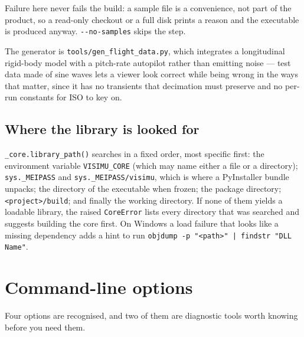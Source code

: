 \documentclass[11pt,a4paper,oneside]{report}
\newcommand{\code}[1]{\texttt{#1}}
\begin{document}
Failure here never fails the build: a sample file is a convenience, not part of
the product, so a read-only checkout or a full disk prints a reason and the
executable is produced anyway. \code{-{}-no-samples} skips the step.

The generator is \code{tools/gen\_flight\_data.py}, which integrates a
longitudinal rigid-body model with a pitch-rate autopilot rather than emitting
noise --- test data made of sine waves lets a viewer look correct while being
wrong in the ways that matter, since it has no transients that decimation must
preserve and no per-run constants for ISO to key on.

\subsection{Where the library is looked for}

\code{\_core.library\_path()} searches in a fixed order, most specific first:
the environment variable \code{VISIMU\_CORE} (which may name either a file or
a directory); \code{sys.\_MEIPASS} and \code{sys.\_MEIPASS/visimu}, which is
where a PyInstaller bundle unpacks; the directory of the executable when frozen;
the package directory; \code{<project>/build}; and finally the working
directory. If none of them yields a loadable library, the raised
\code{CoreError} lists every directory that was searched and suggests building
the core first. On Windows a load failure that looks like a missing dependency
adds a hint to run \code{objdump -p "<path>" | findstr "DLL Name"}.

\section{Command-line options}

Four options are recognised, and two of them are diagnostic tools worth knowing
before you need them.
\end{document}
